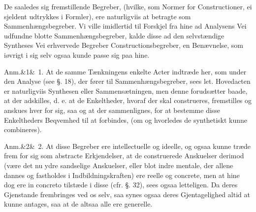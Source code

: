\documentclass[12pt]{book}
\makeatletter
\def\sperr#1{#1}%
\def\textit#1{#1}%
\def\emph#1{#1}%
\newcommand{\sperr}[1]{\textls[180]{#1}}
\newcommand{\umph}[2][misc]{%
  \@ifundefined{umph@#1@on}{#2}{\emph{#2}}}
\newcommand{\anm}[1]{%
  \par\vspace{0.5\baselineskip}%
  \noindent\hspace{\parindent}\sperr{Anm.}\ifx&#1&\else~\textit{#1}.\fi
  \enspace\ignorespaces
}
\newcommand{\opage}[1]{\marginnote{\footnotesize\textit{[#1]}}}
\makeatother
\begin{document}
De saaledes sig fremstillende Begreber, (hvilke, som Normer for Constructioner, ei
sjeldent udtrykkes i Formler), ere naturligviis at betragte som Sammenhængsbegreber. Vi
ville imidlertid til Forskjel fra hine ad Analysens Vei udfundne blotte
Sammenhængsbegreber, kalde disse
\opage{160} ad den selvstændige Syntheses Vei erhvervede Begreber \emph{Constructionsbegreber}, en
Benævnelse, som iøvrigt i sig selv ogsaa kunde passe sig paa hine.

\anm{1} At de samme Tænkningens enkelte Acter indtræde her, som under den Analyse (see
§. 18), der fører til Sammenhængsbegreber, sees let. Hovedacten er naturligviis
Synthesen eller Sammensætningen, men denne forudsætter baade, at der adskilles, d. e.
at de Enkeltheder, hvoraf der skal construeres, fremstilles og anskues hver for sig,
saa og at der sammenlignes, for at bestemme disse Enkeltheders Beqvemhed til at
forbindes, (om og hvorledes de synthetiskt kunne combineres).

\anm{2} At disse Begreber ere \emph{intellectuelle og ideelle}, og ogsaa kunne træde
frem for sig som \emph{abstracte Erkjendelser}, at de construerede Anskuelser derimod
(være det nu ydre sandselige Anskuelser, eller blot indre mentale, der allene dannes og
fastholdes i Indbildningskraften) ere reelle og concrete, men at hine dog ere
\textit{in concreto} tilstæde i disse (cfr. §. 32), sees ogsaa letteligen. Da deres
Gjenstande frembringes ved os selv, saa synes ogsaa deres Gjentagelighed altid at kunne
antages, saa at de altsaa alle ere generelle.
\end{document}

